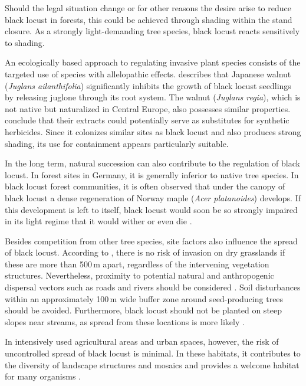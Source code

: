 Should the legal situation change or for other reasons the desire arise to reduce black locust in forests, this could be achieved through shading within the stand closure. As a strongly light-demanding tree species, black locust reacts sensitively to shading.

An ecologically based approach to regulating invasive plant species consists of the targeted use of species with allelopathic effects. \citet{jung2010robinie} describes that Japanese walnut (\emph{Juglans ailanthifolia}) significantly inhibits the growth of black locust seedlings by releasing juglone through its root system. The walnut (\emph{Juglans regia}), which is not native but naturalized in Central Europe, also possesses similar properties. \citet{dordevic2022nussAllelopathi} conclude that their extracts could potentially serve as substitutes for synthetic herbicides. Since it colonizes similar sites as black locust and also produces strong shading, its use for containment appears particularly suitable.

In the long term, natural succession can also contribute to the regulation of black locust. In forest sites in Germany, it is generally inferior to native tree species. In black locust forest communities, it is often observed that under the canopy of black locust a dense regeneration of Norway maple (\emph{Acer platanoides}) develops. If this development is left to itself, black locust would soon be so strongly impaired in its light regime that it would wither or even die \citep{kohler1963robinie}.

Besides competition from other tree species, site factors also influence the spread of black locust. According to \citet[p.~134]{landeck2022robinie}, there is no risk of invasion on dry grasslands if these are more than 500\,m apart, regardless of the intervening vegetation structures. Nevertheless, proximity to potential natural and anthropogenic dispersal vectors such as roads and rivers should be considered \citep{skowronek2020robinieNaturschutz}. Soil disturbances within an approximately 100\,m wide buffer zone around seed-producing trees should be avoided. Furthermore, black locust should not be planted on steep slopes near streams, as spread from these locations is more likely \citep{morimoto2009robinie}.

In intensively used agricultural areas and urban spaces, however, the risk of uncontrolled spread of black locust is minimal. In these habitats, it contributes to the diversity of landscape structures and mosaics and provides a welcome habitat for many organisms \citep{vitkova2018robinie}.

